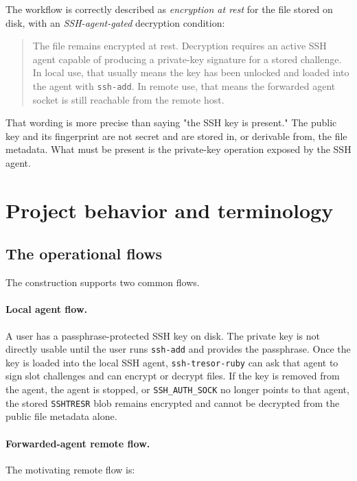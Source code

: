 \documentclass[11pt]{article}
\theoremstyle{definition}
\theoremstyle{plain}
\newcommand{\Project}{\texttt{ssh-tresor-ruby}}
\newcommand{\Tresor}{\texttt{SSHTRESR}}
\begin{document}
The workflow is correctly described as \emph{encryption at rest} for the file stored on disk, with an \emph{SSH-agent-gated} decryption condition:

\begin{quote}
The file remains encrypted at rest. Decryption requires an active SSH agent capable of producing a private-key signature for a stored challenge. In local use, that usually means the key has been unlocked and loaded into the agent with \texttt{ssh-add}. In remote use, that means the forwarded agent socket is still reachable from the remote host.
\end{quote}

That wording is more precise than saying "the SSH key is present." The public key and its fingerprint are not secret and are stored in, or derivable from, the file metadata. What must be present is the private-key operation exposed by the SSH agent.

\section{Project behavior and terminology}

\subsection{The operational flows}

The construction supports two common flows.

\paragraph{Local agent flow.}
A user has a passphrase-protected SSH key on disk. The private key is not directly usable until the user runs \texttt{ssh-add} and provides the passphrase. Once the key is loaded into the local SSH agent, \Project{} can ask that agent to sign slot challenges and can encrypt or decrypt files. If the key is removed from the agent, the agent is stopped, or \texttt{SSH\_AUTH\_SOCK} no longer points to that agent, the stored \Tresor{} blob remains encrypted and cannot be decrypted from the public file metadata alone.

\paragraph{Forwarded-agent remote flow.}
The motivating remote flow is:
\end{document}
